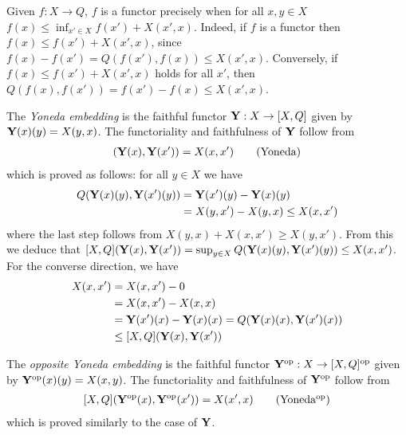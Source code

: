 %
\begin{remark}\label{rem:functor}
Given $f:X\to Q$, $f$ is a functor precisely when for all $x,y\in X$ $f(x)\leq\inf_{x'\in X}f(x')+X(x',x)$. 
Indeed, if $f$ is a functor then $f(x)\leq f(x')+X(x',x)$, since $f(x)-f(x')=Q(f(x'),f(x))\leq X(x',x)$. 
Conversely, if $f(x)\leq f(x')+X(x',x)$ holds for all $x'$, then 
$Q(f(x),f(x'))=f(x')-f(x)\leq X(x',x)$. 
\end{remark}



\begin{remark}


The \emph{Yoneda embedding} is the faithful functor $\mathbf{Y}: X\to [X,Q]$ given by $\mathbf{Y}(x)(y)=X(y,x)$. The functoriality and faithfulness of $\mathbf{Y}$ follow from
\begin{align}
[X,Q](\B Y(x),\B Y(x'))= X(x,x') \tag{Yoneda}
\end{align}
which is proved as follows: for all $y\in X$ we have 
\begin{align*}
Q( \mathbf{Y}(x)(y),\mathbf{Y}(x')(y))&= \mathbf{Y}(x')(y)-\mathbf{Y}(x)(y) \\
&= X(y,x')-X(y,x) \leq X(x,x')
\end{align*}
where the last step follows from $X(y,x)+X(x,x')\geq X(y,x')$. 
From this we deduce that $[X,Q](\mathbf{Y}(x),\mathbf{Y}(x'))=\sup_{y\in X}Q( \mathbf{Y}(x)(y),\mathbf{Y}(x')(y))\leq X(x,x')$. 
For the converse direction, we have  
\begin{align*}
X(x,x') &  = X(x,x') - 0 \\ &=
X(x,x')- X(x,x)
\\& =\mathbf{Y}(x')(x)-\mathbf{Y}(x)(x)= Q(\mathbf{Y}(x)(x),\mathbf{Y}(x')(x))\\
&\leq [X,Q](\mathbf{Y}(x), \mathbf{Y}(x'))
\end{align*}
\end{remark}


\begin{remark}
The \emph{opposite Yoneda embedding} is the faithful functor
$\mathbf{Y}^{\mathrm{op}}: X\to [X,Q]^{\mathrm{op}}$ given by $\mathbf{Y}^{\mathrm{op}}(x)(y)=X(x,y)$. The functoriality and faithfulness of $\mathbf{Y}^{\mathrm{op}}$ follow from
\begin{align}\label{eq:yonedaop}
[X,Q](\B Y^{\mathrm{op}}(x),\B Y^{\mathrm{op}}(x'))= X(x',x) \tag{Yoneda$^{\mathrm{op}}$}
\end{align}
which is proved similarly to the case of $\mathbf{Y}$.
\end{remark}

